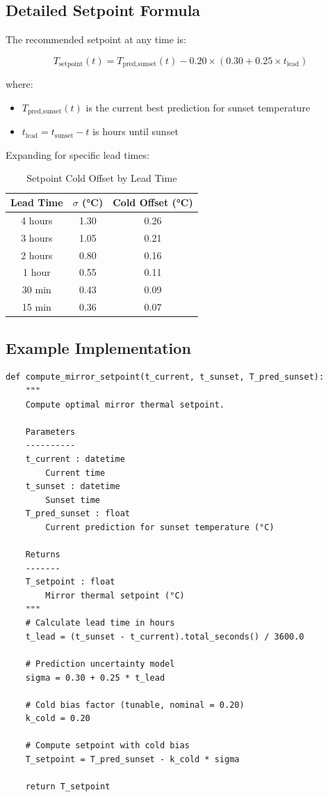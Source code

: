 \documentclass[11pt,letterpaper]{article}
\begin{document}
\subsection{Detailed Setpoint Formula}

The recommended setpoint at any time is:

\begin{equation}
\boxed{T_{\text{setpoint}}(t) = T_{\text{pred,sunset}}(t) - 0.20 \times (0.30 + 0.25 \times t_{\text{lead}})}
\label{eq:recommended}
\end{equation}

where:
\begin{itemize}
    \item $T_{\text{pred,sunset}}(t)$ is the current best prediction for sunset temperature
    \item $t_{\text{lead}} = t_{\text{sunset}} - t$ is hours until sunset
\end{itemize}

Expanding for specific lead times:

\begin{table}[h]
\centering
\caption{Setpoint Cold Offset by Lead Time}
\begin{tabular}{ccc}
\toprule
\textbf{Lead Time} & \textbf{$\sigma$ (°C)} & \textbf{Cold Offset (°C)} \\
\midrule
4 hours & 1.30 & 0.26 \\
3 hours & 1.05 & 0.21 \\
2 hours & 0.80 & 0.16 \\
1 hour & 0.55 & 0.11 \\
30 min & 0.43 & 0.09 \\
15 min & 0.36 & 0.07 \\
\bottomrule
\end{tabular}
\label{tab:offsets}
\end{table}

\subsection{Example Implementation}

\begin{verbatim}
def compute_mirror_setpoint(t_current, t_sunset, T_pred_sunset):
    """
    Compute optimal mirror thermal setpoint.

    Parameters
    ----------
    t_current : datetime
        Current time
    t_sunset : datetime
        Sunset time
    T_pred_sunset : float
        Current prediction for sunset temperature (°C)

    Returns
    -------
    T_setpoint : float
        Mirror thermal setpoint (°C)
    """
    # Calculate lead time in hours
    t_lead = (t_sunset - t_current).total_seconds() / 3600.0

    # Prediction uncertainty model
    sigma = 0.30 + 0.25 * t_lead

    # Cold bias factor (tunable, nominal = 0.20)
    k_cold = 0.20

    # Compute setpoint with cold bias
    T_setpoint = T_pred_sunset - k_cold * sigma

    return T_setpoint
\end{verbatim}
\end{document}
